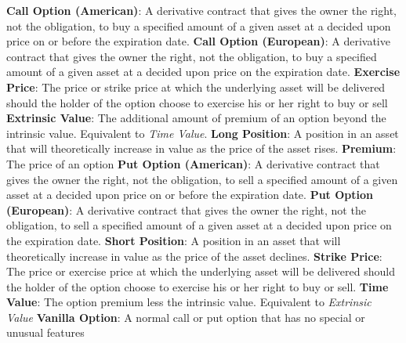 \documentclass[12pt, a4paper, notitlepage]{article}
\numberwithin{equation}{subsection}
\numberwithin{figure}{subsection}
\numberwithin{table}{subsection}
\begin{document}
\textbf{Call Option (American)}: A derivative contract that gives the owner the right, not the obligation, to buy a specified amount of a given asset at a decided upon price on or before the expiration date.
\newline \newline
\textbf{Call Option (European)}: A derivative contract that gives the owner the right, not the obligation, to buy a specified amount of a given asset at a decided upon price on the expiration date.
\newline \newline
\textbf{Exercise Price}: The price or strike price at which the underlying asset will be delivered should the holder of the option choose to exercise his or her right to buy or sell
\newline \newline
\textbf{Extrinsic Value}: The additional amount of premium of an option beyond the intrinsic value. Equivalent to \textit{Time Value}.
\newline \newline
\textbf{Long Position}: A position in an asset that will theoretically increase in value as the price of the asset rises.
\newline \newline
\textbf{Premium}: The price of an option
\newline \newline
\textbf{Put Option (American)}: A derivative contract that gives the owner the right, not the obligation, to sell a specified amount of a given asset at a decided upon price on or before the expiration date.
\newline \newline
\textbf{Put Option (European)}: A derivative contract that gives the owner the right, not the obligation, to sell a specified amount of a given asset at a decided upon price on the expiration date.
\newline \newline
\textbf{Short Position}: A position in an asset that will theoretically increase in value as the price of the asset declines.
\newline \newline
\textbf{Strike Price}: The price or exercise price at which the underlying asset will be delivered should the holder of the option choose to exercise his or her right to buy or sell.
\newline \newline
\textbf{Time Value}: The option premium less the intrinsic value.  Equivalent to \textit{Extrinsic Value}
\newline \nolinebreak
\textbf{Vanilla Option}: A normal call or put option that has no special or unusual features
\end{document}
